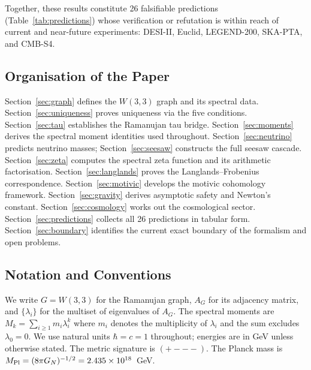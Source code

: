 \noindent
Together, these results constitute 26 falsifiable predictions
(Table~\ref{tab:predictions}) whose verification or refutation is within
reach of current and near-future experiments: DESI-II, Euclid, LEGEND-200,
SKA-PTA, and CMB-S4.

\subsection*{Organisation of the Paper}

Section~\ref{sec:graph} defines the $W(3,3)$ graph and its spectral data.
Section~\ref{sec:uniqueness} proves uniqueness via the five conditions.
Section~\ref{sec:tau} establishes the Ramanujan tau bridge.
Section~\ref{sec:moments} derives the spectral moment identities used throughout.
Section~\ref{sec:neutrino} predicts neutrino masses; Section~\ref{sec:seesaw}
constructs the full seesaw cascade.
Section~\ref{sec:zeta} computes the spectral zeta function and its
arithmetic factorisation.
Section~\ref{sec:langlands} proves the Langlands--Frobenius correspondence.
Section~\ref{sec:motivic} develops the motivic cohomology framework.
Section~\ref{sec:gravity} derives asymptotic safety and Newton's constant.
Section~\ref{sec:cosmology} works out the cosmological sector.
Section~\ref{sec:predictions} collects all 26 predictions in tabular form.
Section~\ref{sec:boundary} identifies the current exact boundary of the
formalism and open problems.

\subsection*{Notation and Conventions}

We write $G = W(3,3)$ for the Ramanujan graph, $A_G$ for its adjacency
matrix, and $\{\lambda_i\}$ for the multiset of eigenvalues of $A_G$.
The spectral moments are $M_k = \sum_{i\geq 1} m_i \lambda_i^k$ where $m_i$
denotes the multiplicity of $\lambda_i$ and the sum excludes $\lambda_0 = 0$.
We use natural units $\hbar = c = 1$ throughout; energies are in GeV unless
otherwise stated.  The metric signature is $({+}{-}{-}{-})$.
The Planck mass is $M_{\rm Pl} = (8\pi G_N)^{-1/2} = 2.435\times 10^{18}$~GeV.
